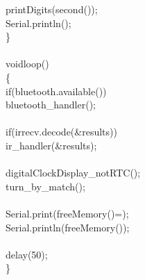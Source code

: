 \documentclass[a4paper, 12pt]{article}
\newcommand\SPC{\hspace*{0.6em}}
\newcommand\QOT{\mbox{\char 34}}
\newcommand{\CppAIdentifier}[1]{\textcolor[rgb]{0,1,0}{#1}}
\newcommand{\CppANumber}[1]{\textcolor[rgb]{0,0,1}{#1}}
\newcommand{\CppAReservedWord}[1]{\textcolor[rgb]{0,0.5,0}{#1}}
\newcommand{\CppASpace}[1]{\textcolor[rgb]{1,1,1}{\colorbox[rgb]{0,0,0}{#1}}}
\newcommand{\CppAString}[1]{\textcolor[rgb]{0.76,0.76,0.76}{#1}}
\newcommand{\CppASymbol}[1]{\textcolor[rgb]{1,0,0}{#1}}
\begin{document}
\begin{ttfamily}
\CppASpace{\SPC \SPC }\CppAIdentifier{printDigits}\CppASymbol{(}\CppAIdentifier{second}\CppASymbol{(}\CppASymbol{)}\CppASymbol{)}\CppASymbol{;}\\
\CppASpace{\SPC \SPC }\CppAIdentifier{Serial}\CppASymbol{.}\CppAIdentifier{println}\CppASymbol{(}\CppASymbol{)}\CppASymbol{;}\CppASpace{\SPC }\\
\CppASymbol{\}}\\
\\
\CppAReservedWord{void}\CppASpace{\SPC }\CppAIdentifier{loop}\CppASpace{\SPC }\CppASymbol{(}\CppASymbol{)}\\
\CppASpace{\SPC }\CppASymbol{\{}\CppASpace{\SPC \SPC }\\
\CppASpace{\SPC \SPC }\CppAReservedWord{if}\CppASymbol{(}\CppAIdentifier{bluetooth}\CppASymbol{.}\CppAIdentifier{available}\CppASymbol{(}\CppASymbol{)}\CppASymbol{)}\\
\CppASpace{\SPC \SPC \SPC \SPC }\CppAIdentifier{bluetooth\_handler}\CppASymbol{(}\CppASymbol{)}\CppASymbol{;}\CppASpace{\SPC \SPC }\\
\CppASpace{\SPC \SPC }\\
\CppASpace{\SPC \SPC }\CppAReservedWord{if}\CppASpace{\SPC }\CppASymbol{(}\CppAIdentifier{irrecv}\CppASymbol{.}\CppAIdentifier{decode}\CppASymbol{(}\CppASymbol{\&}\CppAIdentifier{results}\CppASymbol{)}\CppASymbol{)}\\
\CppASpace{\SPC \SPC \SPC \SPC }\CppAIdentifier{ir\_handler}\CppASymbol{(}\CppASymbol{\&}\CppAIdentifier{results}\CppASymbol{)}\CppASymbol{;}\\
\\
\CppASpace{\SPC \SPC }\CppAIdentifier{digitalClockDisplay\_notRTC}\CppASymbol{(}\CppASymbol{)}\CppASymbol{;}\\
\CppASpace{\SPC \SPC }\CppAIdentifier{turn\_by\_match}\CppASymbol{(}\CppASymbol{)}\CppASymbol{;}\\
\CppASpace{\SPC \SPC }\\
\CppASpace{\SPC \SPC }\CppAIdentifier{Serial}\CppASymbol{.}\CppAIdentifier{print}\CppASymbol{(}\CppAString{\QOT freeMemory()=\QOT }\CppASymbol{)}\CppASymbol{;}\\
\CppASpace{\SPC \SPC }\CppAIdentifier{Serial}\CppASymbol{.}\CppAIdentifier{println}\CppASymbol{(}\CppAIdentifier{freeMemory}\CppASymbol{(}\CppASymbol{)}\CppASymbol{)}\CppASymbol{;}\\
\\
\CppASpace{\SPC \SPC }\CppAIdentifier{delay}\CppASymbol{(}\CppANumber{50}\CppASymbol{)}\CppASymbol{;}\\
\CppASpace{\SPC \SPC }\CppASymbol{\}}\\

\end{ttfamily}
\end{document}
